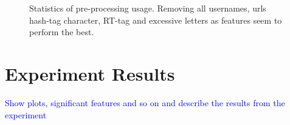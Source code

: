\begin{figure}[htb]
	\centering
	\label{fig:preprocess_usage}
	\caption[Statistics of pre-processing usage.]{Statistics of pre-processing usage. Removing all usernames, urls hash-tag character, RT-tag and excessive letters as features seem to perform the best.}
\end{figure}

\section{Experiment Results}
\textcolor{blue}{Show plots, significant features and so on and describe the results from the experiment}

